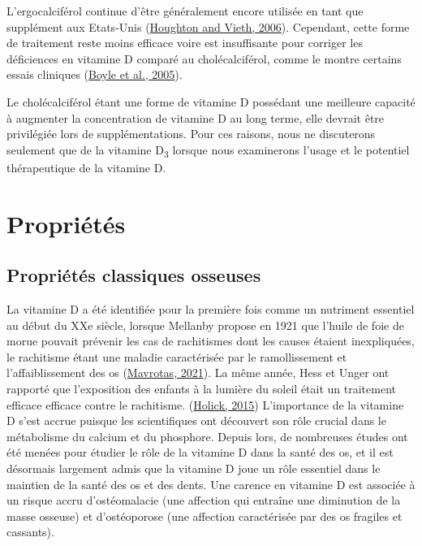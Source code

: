 \documentclass[
  a4paper,
  DIV=11,
  numbers=noendperiod,
  listof=totoc]{scrreprt}
\begin{document}
L'ergocalciférol continue d'être généralement encore utilisée en tant
que supplément aux Etats-Unis
(\protect\hyperlink{ref-Houghton.2006}{Houghton and Vieth, 2006}).
Cependant, cette forme de traitement reste moins efficace voire est
insuffisante pour corriger les déficiences en vitamine D comparé au
cholécalciférol, comme le montre certains essais cliniques
(\protect\hyperlink{ref-Boyle.2005}{Boyle et al., 2005}).

Le cholécalciférol étant une forme de vitamine D possédant une meilleure
capacité à augmenter la concentration de vitamine D au long terme, elle
devrait être privilégiée lors de supplémentations. Pour ces raisons,
nous ne discuterons seulement que de la vitamine D\textsubscript{3}
lorsque nous examinerons l'usage et le potentiel thérapeutique de la
vitamine D.

\hypertarget{propriuxe9tuxe9s}{%
\section{Propriétés}\label{propriuxe9tuxe9s}}

\hypertarget{propriuxe9tuxe9s-classiques-osseuses}{%
\subsection{Propriétés classiques
osseuses}\label{propriuxe9tuxe9s-classiques-osseuses}}

La vitamine D a été identifiée pour la première fois comme un nutriment
essentiel au début du XXe siècle, lorsque Mellanby propose en 1921 que
l'huile de foie de morue pouvait prévenir les cas de rachitismes dont
les causes étaient inexpliquées, le rachitisme étant une maladie
caractérisée par le ramollissement et l'affaiblissement des os
(\protect\hyperlink{ref-Mavrotas.2021}{Mavrotas, 2021}). La même année,
Hess et Unger ont rapporté que l'exposition des enfants à la lumière du
soleil était un traitement efficace efficace contre le rachitisme.
(\protect\hyperlink{ref-Holick.2015}{Holick, 2015}) L'importance de la
vitamine D s'est accrue puisque les scientifiques ont découvert son rôle
crucial dans le métabolisme du calcium et du phosphore. Depuis lors, de
nombreuses études ont été menées pour étudier le rôle de la vitamine D
dans la santé des os, et il est désormais largement admis que la
vitamine D joue un rôle essentiel dans le maintien de la santé des os et
des dents. Une carence en vitamine D est associée à un risque accru
d'ostéomalacie (une affection qui entraîne une diminution de la masse
osseuse) et d'ostéoporose (une affection caractérisée par des os
fragiles et cassants).
\end{document}
